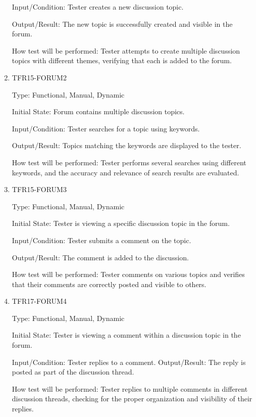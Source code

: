 \documentclass[12pt, titlepage]{article}
\begin{document}
\begin{enumerate}
Input/Condition: Tester creates a new discussion topic.

Output/Result: The new topic is successfully created and visible in the forum.

How test will be performed: Tester attempts to create multiple discussion topics with different themes, verifying that each is added to the forum.

\item{TFR15-FORUM2\\}\label{TFR15-FORUM2}

Type: Functional, Manual, Dynamic

Initial State: Forum contains multiple discussion topics.

Input/Condition: Tester searches for a topic using keywords.

Output/Result: Topics matching the keywords are displayed to the tester.

How test will be performed: Tester performs several searches using different keywords, and the accuracy and relevance of search results are evaluated.


\item{TFR15-FORUM3\\}\label{TFR16-FORUM3}

Type: Functional, Manual, Dynamic

Initial State: Tester is viewing a specific discussion topic in the forum.

Input/Condition: Tester submits a comment on the topic.

Output/Result: The comment is added to the discussion.

How test will be performed: Tester comments on various topics and verifies that their comments are correctly posted and visible to others.

\item{TFR17-FORUM4\\}\label{TFR17-FORUM4}

Type: Functional, Manual, Dynamic

Initial State: Tester is viewing a comment within a discussion topic in the forum.

Input/Condition: Tester replies to a comment.
Output/Result: The reply is posted as part of the discussion thread.

How test will be performed: Tester replies to multiple comments in different discussion threads, checking for the proper organization and visibility of their replies.


\end{enumerate}
\end{document}
